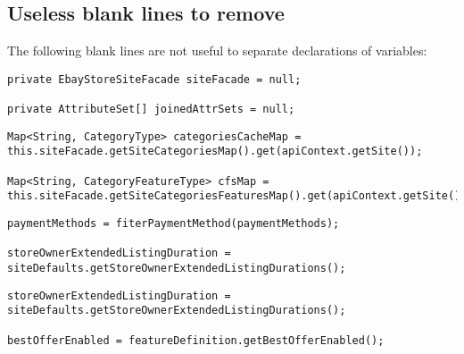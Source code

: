 \subsection{Useless blank lines to remove}
The following blank lines are not useful to separate declarations of variables:
\begin{lstlisting}[firstnumber=63, caption={Lines 63 violation of the rule}]
private EbayStoreSiteFacade siteFacade = null;

private AttributeSet[] joinedAttrSets = null;
\end{lstlisting}
\begin{lstlisting}[firstnumber=113, caption={Lines 113 violation of the rule}]
Map<String, CategoryType> categoriesCacheMap = this.siteFacade.getSiteCategoriesMap().get(apiContext.getSite());

Map<String, CategoryFeatureType> cfsMap = this.siteFacade.getSiteCategoriesFeaturesMap().get(apiContext.getSite());
\end{lstlisting}
\begin{lstlisting}[firstnumber=155, caption={Lines 155 violation of the rule}]
paymentMethods = fiterPaymentMethod(paymentMethods);

storeOwnerExtendedListingDuration = siteDefaults.getStoreOwnerExtendedListingDurations();
\end{lstlisting}
\begin{lstlisting}[firstnumber=155, caption={Lines 155 violation of the rule}]
storeOwnerExtendedListingDuration = siteDefaults.getStoreOwnerExtendedListingDurations();

bestOfferEnabled = featureDefinition.getBestOfferEnabled();
\end{lstlisting}



